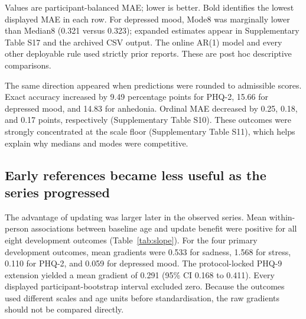 \documentclass[pdflatex,sn-vancouver-num]{sn-jnl}
\begin{document}
\begin{table}[!htbp]
\caption{Post hoc leakage-safe comparator performance for the primary outcomes.}\label{tab:comparators}
\centering\small
{}
\begin{flushleft}\footnotesize Values are participant-balanced MAE; lower is better. Bold identifies the lowest displayed MAE in each row. For depressed mood, Mode8 was marginally lower than Median8 (0.321 versus 0.323); expanded estimates appear in Supplementary Table S17 and the archived CSV output. The online AR(1) model and every other deployable rule used strictly prior reports. These are post hoc descriptive comparisons.\end{flushleft}
\end{table}

The same direction appeared when predictions were rounded to admissible scores. Exact accuracy increased by 9.49 percentage points for PHQ-2, 15.66 for depressed mood, and 14.83 for anhedonia. Ordinal MAE decreased by 0.25, 0.18, and 0.17 points, respectively (Supplementary Table S10). These outcomes were strongly concentrated at the scale floor (Supplementary Table S11), which helps explain why medians and modes were competitive.

\subsection{Early references became less useful as the series progressed}

The advantage of updating was larger later in the observed series. Mean within-person associations between baseline age and update benefit were positive for all eight development outcomes (Table~\ref{tab:slope}). For the four primary development outcomes, mean gradients were 0.533 for sadness, 1.568 for stress, 0.110 for PHQ-2, and 0.059 for depressed mood. The protocol-locked PHQ-9 extension yielded a mean gradient of 0.291 (95\% CI 0.168 to 0.411). Every displayed participant-bootstrap interval excluded zero. Because the outcomes used different scales and age units before standardisation, the raw gradients should not be compared directly.
\end{document}
